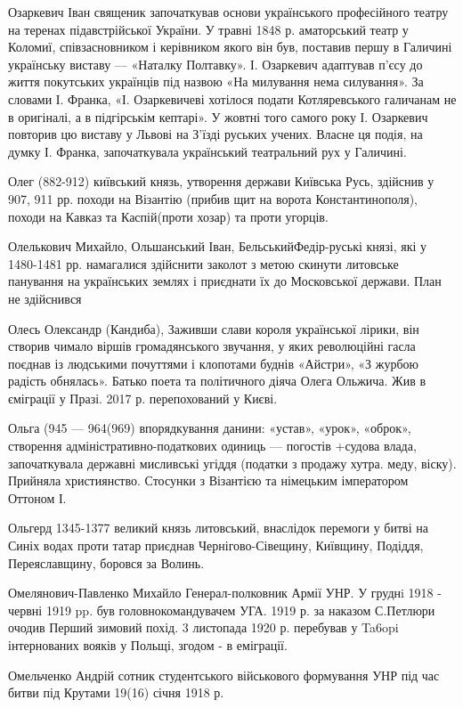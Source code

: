 Озаркевич Іван священик  започаткував основи українського професійного театру на теренах підавстрійської України. У травні 1848 р. аматорський театр у Коломиї, співзасновником і керівником якого він був, поставив першу в Галичині українську виставу --- «Наталку Полтавку». І. Озаркевич адаптував п’єсу до життя покутських українців під назвою «На милування нема силування». За словами І. Франка, «І. Озаркевичеві хотілося подати Котляревського галичанам не в оригіналі, а в підгірськім кептарі». У жовтні того самого року І. Озаркевич повторив цю виставу у Львові на З’їзді руських учених. Власне ця подія, на думку І. Франка, започаткувала український театральний рух у Галичині. 

Олег (882-912) київський князь, утворення держави Київська Русь, здійснив у 907, 911 рр. походи на Візантію (прибив щит на ворота Константинополя), походи на Кавказ та Каспій(проти хозар) та проти угорців.

Олелькович Михайло, Ольшанський Іван, БельськийФедір-руські князі, які у 1480-1481 рр. намагалися здійснити заколот з метою скинути литовське панування на українських землях і приєднати їх до Московської держави. План не здійснився

Олесь Олександр (Кандиба), Заживши слави короля української лірики, він створив чимало віршів громадянського звучання, у яких революційні гасла поєднав із людськими почуттями і клопотами буднів «Айстри», «З журбою радість обнялась». Батько поета та політичного діяча Олега Ольжича. Жив в єміграції у Празі. 2017 р. перепохований у Києві.

Ольга (945 --- 964(969) впорядкування данини: «устав», «урок», «оброк», створення адміністративно-податкових одиниць --- погостів +судова влада, започаткувала державні мисливські угіддя (податки з продажу хутра. меду, віску). Прийняла християнство. Стосунки з Візантією та німецьким імператором Оттоном І.

Ольгерд 1345-1377 великий князь литовський, внаслідок перемоги у битві на Синіх водах проти татар приєднав Чернігово-Сівещину, Київщину, Подіддя, Переяславщину, боровся за Волинь.

Омелянович-Павленко Михайло  Генерал-полковник Армії УНР. У груднi 1918 - червні 1919 pp. був головнокомандувачем УГА. 1919 р. за наказом С.Петлюри очодив Перший зимовий похід. 3 листопада 1920 р. перебував у Ta6opi інтернованих вояків у Польщі, згодом - в еміграції. 

Омельченко Андрій сотник студентського військового формування УНР під час битви під Крутами 19(16) січня 1918 р. 

